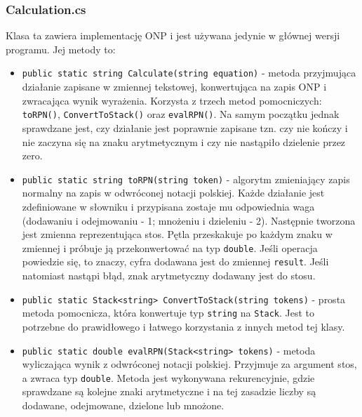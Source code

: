\documentclass[12pt,a4paper]{article}
\begin{document}
\subsubsection*{Calculation.cs}
\hspace{20pt} Klasa ta zawiera implementację ONP i jest używana jedynie w głównej wersji programu. Jej metody to:
	\begin{itemize}
	    \item \lstinline{public static string Calculate(string equation)} - metoda przyjmująca działanie zapisane w zmiennej tekstowej, konwertująca na zapis ONP i zwracająca wynik wyrażenia. Korzysta z trzech metod pomocniczych: \lstinline{toRPN()}, \lstinline{ConvertToStack()} oraz \lstinline{evalRPN()}. Na samym początku jednak sprawdzane jest, czy działanie jest poprawnie zapisane tzn. czy nie kończy i nie zaczyna się na znaku arytmetycznym i czy nie nastąpiło dzielenie przez zero.
	    \item \lstinline{public static string toRPN(string token)} - algorytm zmieniający zapis normalny na zapis w odwróconej notacji polskiej. Każde działanie jest zdefiniowane w słowniku i przypisana zostaje mu odpowiednia waga (dodawaniu i odejmowaniu - 1; mnożeniu i dzieleniu - 2). Następnie tworzona jest zmienna reprezentująca stos. Pętla przeskakuje po każdym znaku w zmiennej i próbuje ją przekonwertować na typ \lstinline{double}. Jeśli operacja powiedzie się, to znaczy, cyfra dodawana jest do zmiennej \lstinline{result}. Jeśli natomiast nastąpi błąd, znak arytmetyczny dodawany jest do stosu.
	    
	    \item \lstinline{public static Stack<string> ConvertToStack(string tokens)} - prosta metoda pomocnicza, która konwertuje typ \lstinline{string} na \lstinline{Stack}. Jest to potrzebne do prawidłowego i łatwego korzystania z innych metod tej klasy.
	    \item \lstinline{public static double evalRPN(Stack<string> tokens)} - metoda wyliczająca wynik z odwróconej notacji polskiej. Przyjmuje za argument stos, a zwraca typ \lstinline{double}. Metoda jest wykonywana rekurencyjnie, gdzie sprawdzane są kolejne znaki arytmetyczne i na tej zasadzie liczby są dodawane, odejmowane, dzielone lub mnożone.
	\end{itemize}
\end{document}
